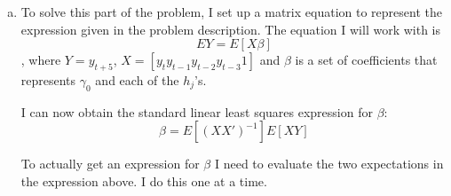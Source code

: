 \documentclass{homework}
\begin{document}
\begin{homeworkProblem}[Problem 2.4]
{\begin{enumerate}[a.]
\begin{enumerate}[i.]
            \item The eigenvalues for $A$ are $\lambda = [ 0.895, 0.049+0.836i,   0.049-0.836i, -0.795, 1.]$, which are all less than 1 in modulus (except the constant term), so there does exist a set of covariance stationary initial conditions. I found that they were equal to:

            \begin{align*}
              \mu = \left[\begin{matrix} 5 \\ 5 \\ 5 \\ 5 \\ 1 \end{matrix}\right]
              \quad & \qquad
              C_x(0) = \begin{bmatrix}
                        1.4764 & 0.415887 & 0.166355 & 0.241214 & 0\\
                        0.415887 & 1.4764 & 0.415887 & 0.166355 & 0\\
                        0.166355 & 0.415887 & 1.4764 & 0.415887 & 0\\
                        0.241214 & 0.166355 & 0.415887 & 1.4764 & 0\\
                        0 & 0 & 0 & 0 & 0\\
                      \end{bmatrix}
            \end{align*}

            \item The eigenvalues for $A$ are $\lambda = [ 0., 0., -0.278233,  1.08,  1.]$, which are all not less than 1 in modulus (except the constant term), so there does not exist a set of covariance stationary initial conditions.
        \end{enumerate} \qed

      \item To solve this part of the problem, I set up a matrix equation to represent the expression given in the problem description. The equation I will work with is $$EY = E[X\beta]$$, where $Y = y_{t+5}$, $X = [y_t y_{t-1} y_{t-2} y_{t-3} 1]$ and $\beta$ is a set of coefficients that represents $\gamma_0$ and each of the $h_j$'s.

        I can now obtain the standard linear least squares expression for $\beta$: $$\beta = E\left[(XX')^{-1}\right] E[XY]$$

        To actually get an expression for $\beta$ I need to evaluate the two expectations in the expression above. I do this one at a time.


\end{enumerate}}
\end{homeworkProblem}
\end{document}
